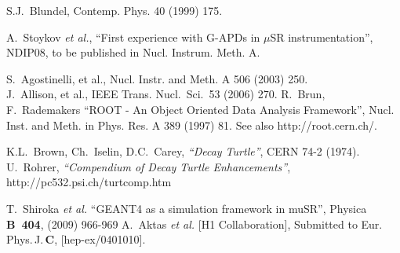 \documentclass[twoside]{dis04}
\begin{document}
\begin{thebibliography}{0}

  S.J.~Blundel,  Contemp. Phys. 40 (1999) 175.

 A.~Stoykov {\it et al.}, ``First experience with G-APDs in $\mu$SR instrumentation'',
	NDIP08, to be published in Nucl. Instrum. Meth. A.

 S.~Agostinelli, et al., Nucl. Instr. and Meth. A 506 (2003) 250.\\ %
                J.~Allison, et al., IEEE Trans. Nucl.\ Sci.\  53 (2006) 270. %
 R.~Brun, F.~Rademakers ``ROOT - An Object Oriented Data Analysis Framework'',
Nucl. Inst. and Meth. in Phys. Res. A 389 (1997) 81.%
See also http://root.cern.ch/.

K.L.~Brown, Ch.~Iselin, D.C.~Carey, {\it``Decay Turtle''}, CERN 74-2 (1974). \\
U.~Rohrer, {\it ``Compendium of Decay Turtle Enhancements''},
http://pc532.psi.ch/turtcomp.htm

T.~Shiroka {\it et al.} ``GEANT4 as a simulation framework in muSR'',
Physica {\bf B~404}, (2009) 966-969
% 
A.~Aktas {\it et al.}  [H1 Collaboration],
Submitted to Eur.\,Phys.\,J.\,{\bf C}, [hep-ex/0401010].




\end{thebibliography}
\end{document}
